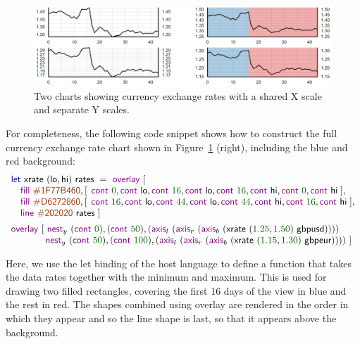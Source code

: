 \documentclass{jfp}
\newcommand{\num}[1]{\textcolor{numclr}{#1}}
\newcommand{\strf}[1]{\textnormal{\textcolor{strclr}{\sffamily #1}}}
\newcommand{\ident}[1]{\textnormal{\textcolor{idclr}{\sffamily #1}}}
\newcommand{\kvd}[1]{\textnormal{\textcolor{kvdclr}{\sffamily #1}}}
\newcommand{\fkvd}[1]{\textnormal{\textcolor{fkvdclr}{\sffamily #1}}}
\begin{document}
\begin{figure}
\includegraphics[scale=0.57]{figures/lines}
\vspace{0.25em}
\caption{Two charts showing currency exchange rates with a shared X scale and separate Y scales.}
\label{fig:lines}
\end{figure}

For completeness, the following code snippet shows how to construct the full currency exchange
rate chart shown in Figure~\ref{fig:lines} (right), including the blue and red background:
%
\begin{equation*}
\begin{array}{l}
\fkvd{let}~\ident{xrate}~(\ident{lo}, \ident{hi})~\ident{rates}~=\kvd{overlay}~[\\
\quad \kvd{fill}~\strf{\#1F77B460}, [\;\,\kvd{cont}~\num{0}, \kvd{cont}~\ident{lo}, \kvd{cont}~\num{16}, \kvd{cont}~\ident{lo}, \kvd{cont}~\num{16}, \kvd{cont}~\ident{hi}, \kvd{cont}~\num{0}, \kvd{cont}~\ident{hi}\;],\\
\quad \kvd{fill}~\strf{\#D6272860}, [\;\,\kvd{cont}~\num{16}, \kvd{cont}~\ident{lo}, \kvd{cont}~\num{44}, \kvd{cont}~\ident{lo}, \kvd{cont}~\num{44}, \kvd{cont}~\ident{hi}, \kvd{cont}~\num{16}, \kvd{cont}~\ident{hi}\;],\\
\quad \kvd{line}~\strf{\#202020}~\ident{rates}~]\\[0.5em]
\kvd{overlay}~[~
\kvd{nest}_y~(\kvd{cont}~\num{0}),(\kvd{cont}~\num{50}), (\kvd{axis}_l~(\kvd{axis}_r~(\kvd{axis}_b~(\ident{xrate}~(\num{1.25}, \num{1.50})~\ident{gbpusd}))))\\
\hspace{3.68em} \kvd{nest}_y~(\kvd{cont}~\num{50}),(\kvd{cont}~\num{100}), (\kvd{axis}_l~(\kvd{axis}_r~(\kvd{axis}_b~(\ident{xrate}~(\num{1.15}, \num{1.30})~\ident{gbpeur}))))~]\\
\end{array}
\end{equation*}

\noindent
Here, we use the \fkvd{let} binding of the host language to define a function that takes
the data \ident{rates} together with the minimum and maximum. This is used for drawing
two filled rectangles, covering the first 16 days of the view in blue and the rest in red.
The shapes combined using \kvd{overlay} are rendered in the order in which they appear and so
the line shape is last, so that it appears above the background.
\end{document}
